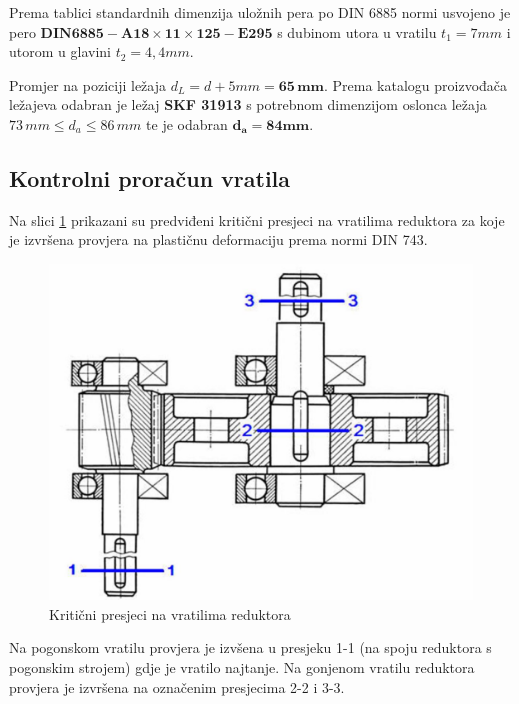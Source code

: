 \documentclass[11pt,a4paper]{report}
\begin{document}
Prema tablici standardnih dimenzija uložnih pera\cite{potrebniMaterijali} po DIN 6885 normi usvojeno je pero $\mathbf{DIN6885-A 18 \times 11 \times 125-E295}$ s dubinom utora u vratilu $t_1=7mm$ i utorom u glavini $t_2=4,4mm$.

Promjer na poziciji ležaja $d_L=d+5mm= \mathbf{65 \,mm}$.
Prema katalogu proizvođača ležajeva\cite{skf} odabran je ležaj \textbf{SKF 31913} s potrebnom dimenzijom oslonca ležaja $73 \, mm \leq d_a \leq 86 \, mm$ te je odabran $\mathbf{d_a=84mm}$.

\subsection{Kontrolni proračun vratila}
Na slici \ref{fig:kriticniPresjeci} prikazani su predviđeni kritični presjeci na vratilima reduktora za koje je izvršena provjera na plastičnu deformaciju prema normi DIN 743.
\begin{figure}[!h]
\includegraphics[width=1\textwidth]{KriticniPresjeci.jpg}
\caption{Kritični presjeci na vratilima reduktora}\label{fig:kriticniPresjeci}
\end{figure}

Na pogonskom vratilu provjera je izvšena u presjeku 1-1 (na spoju reduktora s pogonskim strojem) gdje je vratilo najtanje.
Na gonjenom vratilu reduktora provjera je izvršena na označenim presjecima 2-2 i 3-3.
\end{document}
